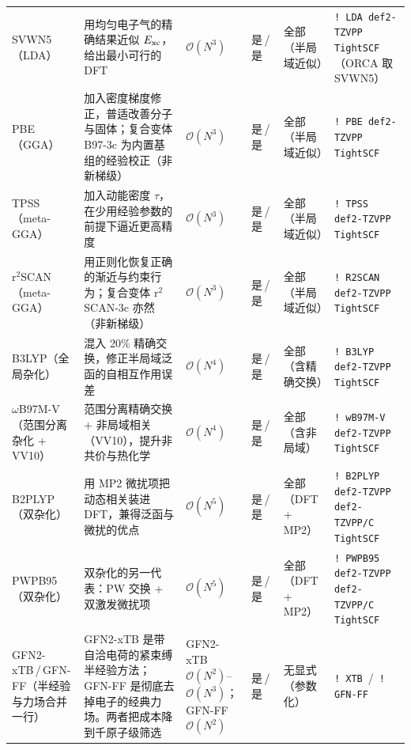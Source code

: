 {\begin{longtable}{@{}p{1.7cm} p{4.5cm} p{1.2cm} p{2.0cm} p{1.9cm} p{2.2cm}@{}}
SVWN5（LDA） & 用均匀电子气的精确结果近似 $E_{\mathrm{xc}}$，给出最小可行的 DFT & $\mathcal{O}(N^3)$ & 是\,/\,是 & 全部（半局域近似） & \texttt{! LDA def2-TZVPP TightSCF}（ORCA 取 SVWN5） \\
PBE（GGA） & 加入密度梯度修正，普适改善分子与固体；复合变体 B97-3c 为内置基组的经验校正（非新梯级） & $\mathcal{O}(N^3)$ & 是\,/\,是 & 全部（半局域近似） & \texttt{! PBE def2-TZVPP TightSCF} \\
TPSS（meta-GGA） & 加入动能密度 $\tau$，在少用经验参数的前提下逼近更高精度 & $\mathcal{O}(N^3)$ & 是\,/\,是 & 全部（半局域近似） & \texttt{! TPSS def2-TZVPP TightSCF} \\
r$^2$SCAN（meta-GGA） & 用正则化恢复正确的渐近与约束行为；复合变体 r$^2$SCAN-3c 亦然（非新梯级） & $\mathcal{O}(N^3)$ & 是\,/\,是 & 全部（半局域近似） & \texttt{! R2SCAN def2-TZVPP TightSCF} \\
B3LYP（全局杂化） & 混入 20\% 精确交换，修正半局域泛函的自相互作用误差 & $\mathcal{O}(N^4)$ & 是\,/\,是 & 全部（含精确交换） & \texttt{! B3LYP def2-TZVPP TightSCF} \\
$\omega$B97M-V（范围分离杂化 + VV10） & 范围分离精确交换 + 非局域相关（VV10），提升非共价与热化学 & $\mathcal{O}(N^4)$ & 是\,/\,是 & 全部（含非局域） & \texttt{! wB97M-V def2-TZVPP TightSCF} \\
B2PLYP（双杂化） & 用 MP2 微扰项把动态相关装进 DFT，兼得泛函与微扰的优点 & $\mathcal{O}(N^5)$ & 是\,/\,是 & 全部（DFT + MP2） & \texttt{! B2PLYP def2-TZVPP def2-TZVPP/C TightSCF} \\
PWPB95（双杂化） & 双杂化的另一代表：PW 交换 + 双激发微扰项 & $\mathcal{O}(N^5)$ & 是\,/\,是 & 全部（DFT + MP2） & \texttt{! PWPB95 def2-TZVPP def2-TZVPP/C TightSCF} \\
GFN2-xTB\,/\,GFN-FF（半经验与力场合并一行） & GFN2-xTB 是带自洽电荷的紧束缚半经验方法；GFN-FF 是彻底去掉电子的经典力场。两者把成本降到千原子级筛选 & GFN2-xTB $\mathcal{O}(N^2)$–$\mathcal{O}(N^3)$；GFN-FF $\mathcal{O}(N^2)$ & 是\,/\,是 & 无显式（参数化） & \texttt{! XTB} \,/\, \texttt{! GFN-FF} \\
\end{longtable}
}


